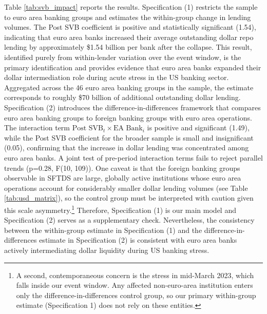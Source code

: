\documentclass[english, 12pt, oneside]{article}
\begin{document}
Table \ref{tab:svb_impact} reports the results. Specification (1) restricts the sample to euro area banking groups and estimates the within-group change in lending volumes. The Post SVB coefficient is positive and statistically significant (1.54), indicating that euro area banks increased their average outstanding dollar repo lending by approximately \$1.54 billion per bank after the collapse.
This result, identified purely from within-lender variation over the event window, is the primary identification and provides evidence that euro area banks expanded their dollar intermediation role during acute stress in the US banking sector.
Aggregated across the 46 euro area banking groups in the sample, the estimate corresponds to roughly \$70 billion of additional outstanding dollar lending.
Specification (2) introduces the difference-in-differences framework that compares euro area banking groups to foreign banking groups with euro area operations. The interaction term $\text{Post SVB}_t \times \text{EA Bank}_i$ is positive and significant (1.49), while the Post SVB coefficient for the broader sample is small and insignificant (0.05), confirming that the increase in dollar lending was concentrated among euro area banks. A joint test of pre-period interaction terms fails to reject parallel trends (p=0.28, F(10, 109)). One caveat is that the foreign banking groups observable in SFTDS are large, globally active institutions whose euro area operations account for considerably smaller dollar lending volumes (see Table \ref{tab:usd_matrix}), so the control group must be interpreted with caution given this scale asymmetry.\footnote{A second, contemporaneous concern is the stress in mid-March 2023, which falls inside our event window. Any affected non-euro-area institution enters only the difference-in-differences control group, so our primary within-group estimate (Specification 1) does not rely on these entities.} Therefore, Specification (1) is our main model and Specification (2) serves as a supplementary check. Nevertheless, the consistency between the within-group estimate in Specification (1) and the difference-in-differences estimate in Specification (2) is consistent with euro area banks actively intermediating dollar liquidity during US banking stress.
\end{document}
